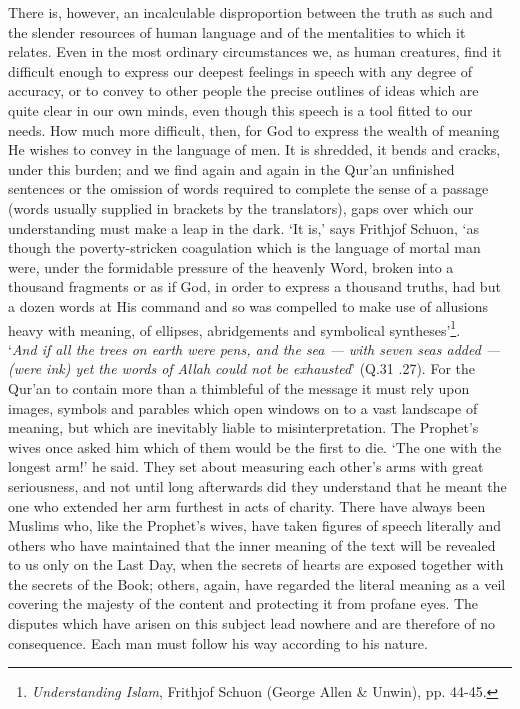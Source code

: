 \documentclass[10pt, twoside]{book}
\begin{document}
There is, however, an incalculable disproportion between the truth as such and the slender resources 
of human language and of the mentalities to which it relates. Even in the most ordinary circumstances 
we, as human creatures, find it difficult enough to express our deepest feelings in speech with any 
degree of accuracy, or to convey to other people the precise outlines of ideas which are quite clear 
in our own minds, even though this speech is a tool fitted to our needs. How much more difficult, 
then, for God to express the wealth of meaning He wishes to convey in the language of men. It is 
shredded, it bends and cracks, under this burden; and we find again and again in the Qur'an 
unfinished sentences or the omission of words required to complete the sense of a passage (words 
usually supplied in brackets by the translators), gaps over which our understanding must make a leap 
in the dark. `It is,' says Frithjof Schuon, `as though the poverty-stricken coagulation which is the 
language of mortal man were, under the formidable pressure of the heavenly Word, broken into a 
thousand fragments or as if God, in order to express a thousand truths, had but a dozen words at His 
command and so was compelled to make use of allusions heavy with meaning, of ellipses, abridgements 
and symbolical syntheses'\footnote{\emph{Understanding Islam}, Frithjof Schuon (George Allen \& Unwin), pp. 44-45.}.\\

`\emph{And if all the trees on earth were pens, and the sea --- with seven seas added --- (were ink) yet the words of Allah could not be exhausted}' (Q.31 .27). For the Qur'an to contain more than a thimbleful of the message it must rely upon images, symbols and parables which open windows on to a vast landscape of meaning, but which are inevitably liable to misinterpretation. The Prophet's wives once asked him which of them would be the first to die. `The one with the longest arm!' he said. They set about 
measuring each other's arms with great seriousness, and not until long afterwards did they understand 
that he meant the one who extended her arm furthest in acts of charity. There have always been 
Muslims who, like the Prophet's wives, have taken figures of speech literally and others who have 
maintained that the inner meaning of the text will be revealed to us only on the Last Day, when the 
secrets of hearts are exposed together with the secrets of the Book; others, again, have regarded the 
literal meaning as a veil covering the majesty of the content and protecting it from profane eyes. 
The disputes which have arisen on this subject lead nowhere and are therefore of no consequence. Each 
man must follow his way according to his nature. \\
\end{document}
